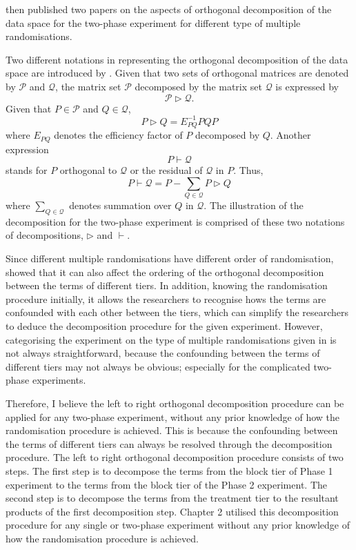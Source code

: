 \documentclass[11pt,a4paper]{article}
\begin{document}
\cite{Brien2009, Brien2010} then published two papers on the aspects of orthogonal decomposition of the data space for the two-phase experiment for different type of multiple randomisations.

Two different notations in representing the  orthogonal decomposition of the data space are introduced by \cite{Brien2009}. Given that two sets of orthogonal matrices are denoted by $\mathcal{P}$ and $\mathcal{Q}$, the matrix set $\mathcal{P}$ decomposed by the matrix set $\mathcal{Q}$ is expressed by
\begin{equation}
\mathcal{P} \rhd \mathcal{Q}.
\end{equation}
Given that $P \in \mathcal{P}$ and $Q \in \mathcal{Q}$, 
\begin{equation}
P \rhd Q =  E_{PQ}^{-1}PQP
\end{equation}
where $E_{PQ}$ denotes the efficiency factor of $P$ decomposed by $Q$. Another expression 
\begin{equation}
P \vdash \mathcal{Q}
\end{equation}
stands for $P$ orthogonal to $ \mathcal{Q}$ or the residual of $\mathcal{Q}$ in $P$. Thus, 
\begin{equation}
P \vdash  \mathcal{Q} = P - \sum_{Q \in \mathcal{Q}} P \rhd Q
\end{equation} 
where $\sum_{Q \in \mathcal{Q}}$ denotes summation over $Q$ in $\mathcal{Q}$. The illustration of the decomposition for the two-phase experiment is comprised of these two notations of decompositions, $\rhd $ and $\vdash$. 

Since different multiple randomisations have different order of randomisation, \cite{Brien2009, Brien2010} showed that it can also affect the ordering of the orthogonal  decomposition between the terms of different tiers. In addition, knowing the randomisation procedure initially, it allows the researchers to recognise hows the terms are confounded with each other between the tiers, which can simplify the researchers to deduce the decomposition procedure for the given experiment. However, categorising the experiment on the type of multiple randomisations given in \cite{Brien2006b} is not always straightforward, because the confounding between the terms of different tiers may not always be obvious; especially for the complicated two-phase experiments. 

Therefore, I believe the left to right orthogonal decomposition procedure can be applied for any two-phase experiment, without any prior knowledge of how the randomisation procedure is achieved. This is because the confounding between the terms of different tiers can always be resolved through the decomposition procedure. The left to right orthogonal decomposition procedure consists of two steps. The first step is to decompose the terms from the block tier of Phase 1 experiment to the terms from the block tier of the Phase 2 experiment. The second step is to decompose the terms from the treatment tier to the resultant products of the first decomposition step. Chapter 2 utilised this decomposition procedure for any single or two-phase experiment without any prior knowledge of how the randomisation procedure is achieved. 
\end{document}
